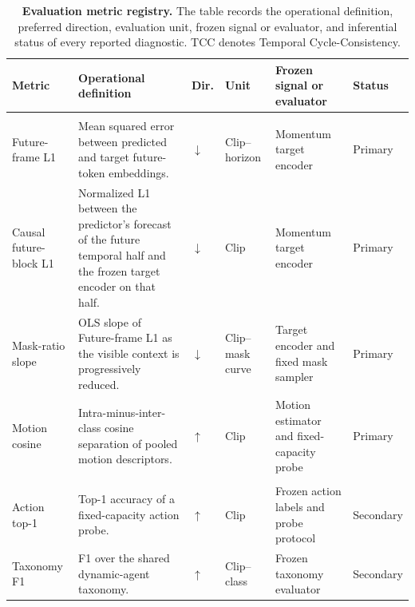 \begin{table}[t]
\centering
\caption{
\textbf{Evaluation metric registry.}
The table records the operational definition, preferred direction,
evaluation unit, frozen signal or evaluator, and inferential status of
every reported diagnostic. TCC denotes Temporal Cycle-Consistency.
}
\label{tab:metric_registry}
\scriptsize
\setlength{\tabcolsep}{3.5pt}
\renewcommand{\arraystretch}{1.13}

\begin{tabularx}{\textwidth}{
    p{}
    p{}
    p{}
    p{}
    p{}
    X
}
\toprule
\textbf{Metric}
&
\textbf{Operational definition}
&
\textbf{Dir.}
&
\textbf{Unit}
&
\textbf{Frozen signal or evaluator}
&
\textbf{Status}
\\
\midrule

\rowcolor{AttrTeal}
\multicolumn{6}{l}{\textbf{Primary predictive diagnostics}}
\\
\midrule

Future-frame L1
&
Mean squared error between predicted and target future-token
embeddings.
&
\(\downarrow\)
&
Clip--horizon
&
Momentum target encoder
&
Primary
\\

Causal future-block L1
&
Normalized L1 between the predictor's forecast of the future temporal
half and the frozen target encoder on that half.
&
\(\downarrow\)
&
Clip
&
Momentum target encoder
&
Primary
\\

Mask-ratio slope
&
OLS slope of Future-frame L1 as the visible context is progressively
reduced.
&
\(\downarrow\)
&
Clip--mask curve
&
Target encoder and fixed mask sampler
&
Primary
\\

Motion cosine
&
Intra-minus-inter-class cosine separation of pooled motion
descriptors.
&
\(\uparrow\)
&
Clip
&
Motion estimator and fixed-capacity probe
&
Primary
\\

\midrule
\rowcolor{AttrBlue}
\multicolumn{6}{l}{\textbf{Semantic diagnostics}}
\\
\midrule

Action top-1
&
Top-1 accuracy of a fixed-capacity action probe.
&
\(\uparrow\)
&
Clip
&
Frozen action labels and probe protocol
&
Secondary
\\

Taxonomy F1
&
F1 over the shared dynamic-agent taxonomy.
&
\(\uparrow\)
&
Clip--class
&
Frozen taxonomy evaluator
&
Secondary
\\


\end{tabularx}
\end{table}
